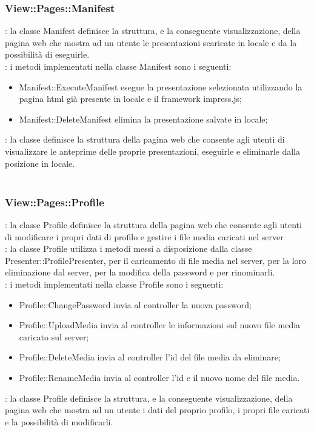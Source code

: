 {{		\subsubsection{View::Pages::Manifest}{
			\textbf{\tipo}: la classe Manifest definisce la struttura, e la conseguente visualizzazione, della pagina web che mostra ad un utente le presentazioni scaricate in locale e da la possibilità di eseguirle.\\
			\textbf{\interfacce}: i metodi implementati nella classe Manifest sono i seguenti:
			\begin{itemize}
				\item Manifest::ExecuteManifest esegue la presentazione selezionata utilizzando la pagina html già presente in locale e il framework impress.js;
				\item Manifest::DeleteManifest elimina la presentazione salvate in locale;
			\end{itemize} 
			\textbf{\attivita}: la classe definisce la struttura della pagina web che consente agli utenti di visualizzare le anteprime delle proprie presentazioni, eseguirle e eliminarle dalla posizione in locale.\\\\
		}
		\subsubsection{View::Pages::Profile}{
			\textbf{\tipo}: la classe Profile definisce la struttura della pagina web che consente agli utenti di modificare i propri dati di profilo e gestire i file media caricati nel server \\
			\textbf{\relaz}: la classe Profile utilizza i metodi messi a disposizione dalla classe Presenter::ProfilePresenter, per il caricamento di file media nel server, per la loro eliminazione dal server, per la modifica della password e per rinominarli.\\
			\textbf{\interfacce}: i metodi implementati nella classe Profile sono i seguenti:
			\begin{itemize}
				\item Profile::ChangePassword invia al controller la nuova password;
				\item Profile::UploadMedia invia al controller le informazioni sul nuovo file media caricato sul server;
				\item Profile::DeleteMedia invia al controller l'id del file media da eliminare;
				\item Profile::RenameMedia invia al controller l'id e il nuovo nome del file media.
			\end{itemize}
			\textbf{\attivita}: la classe Profile definisce la struttura, e la conseguente visualizzazione, della pagina web che mostra ad un utente i dati del proprio profilo, i propri file caricati e la possibilità di modificarli.\\
		}
}}
